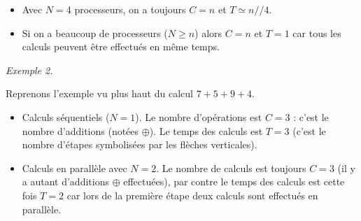 \documentclass[11pt,class=report,crop=false]{standalone}
\begin{document}
\begin{cours}
\begin{itemize}
  \item Avec $N=4$ processeurs, on a toujours $C=n$ et $T \simeq n//4$.
  
  \item Si on a beaucoup de processeurs ($N \ge n$) alors $C=n$ et $T=1$ car tous les calculs peuvent être effectués en même temps.
\end{itemize}

\bigskip

\emph{Exemple 2.}
  

Reprenons l'exemple vu plus haut du calcul $7+5+9+4$. 
\begin{itemize}
  \item Calculs séquentiels ($N=1$).
  Le nombre d'opérations est $C=3$ : c'est le nombre d'additions (notées $\oplus$). Le temps des calculs est $T=3$ (c'est le nombre d'étapes symbolisées par les flèches verticales).
  
  \item Calculs en parallèle avec $N=2$. Le nombre de calculs est toujours $C=3$ (il y a autant d'additions $\oplus$ effectuées), par contre le temps des calculs est cette fois $T=2$ car lors de la première étape deux calculs sont effectués en parallèle.
  
\end{itemize}


\end{cours}


\end{document}

